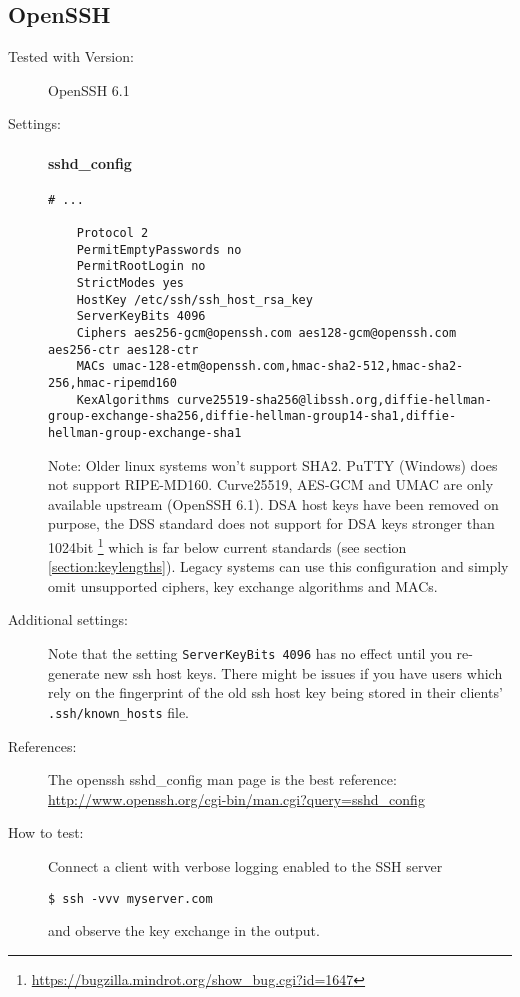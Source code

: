 \subsection{OpenSSH}


\begin{description}
\item[Tested with Version:] OpenSSH 6.1

\item[Settings:] \mbox{}


\paragraph*{sshd_config}
\begin{lstlisting}[breaklines]
	# ...

	Protocol 2
	PermitEmptyPasswords no
	PermitRootLogin no
	StrictModes yes
	HostKey /etc/ssh/ssh_host_rsa_key
	ServerKeyBits 4096
	Ciphers aes256-gcm@openssh.com aes128-gcm@openssh.com aes256-ctr aes128-ctr
	MACs umac-128-etm@openssh.com,hmac-sha2-512,hmac-sha2-256,hmac-ripemd160
	KexAlgorithms curve25519-sha256@libssh.org,diffie-hellman-group-exchange-sha256,diffie-hellman-group14-sha1,diffie-hellman-group-exchange-sha1
\end{lstlisting}


Note: Older linux systems won't support SHA2. PuTTY (Windows) does not support
RIPE-MD160. Curve25519, AES-GCM and UMAC are only available upstream (OpenSSH
6.1). DSA host keys have been removed on purpose, the DSS standard does not
support for DSA keys stronger than 1024bit
\footnote{\url{https://bugzilla.mindrot.org/show_bug.cgi?id=1647}} which is far
below current standards (see section \ref{section:keylengths}). Legacy systems
can use this configuration and simply omit unsupported ciphers, key exchange
algorithms and MACs.  

\item[Additional settings:] \mbox{}

Note that the setting \texttt{ServerKeyBits 4096}  has no effect until you re-generate new ssh host keys. There might be issues if you have users which rely on the fingerprint of the old ssh host key being stored in their clients' \texttt{.ssh/known\_hosts} file.

\item[References:]
The openssh sshd\_config  man page is the best reference: \url{http://www.openssh.org/cgi-bin/man.cgi?query=sshd_config}


\item[How to test:]
Connect a client with verbose logging enabled to the SSH server \\
\begin{lstlisting}[breaklines]
$ ssh -vvv myserver.com
\end{lstlisting}and observe the key exchange in the output.
\end{description}

